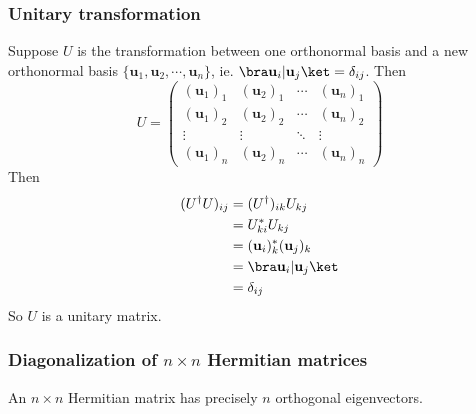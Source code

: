 \documentclass[a4paper]{article}
\begin{document}
\subsubsection{Unitary transformation}
Suppose $U$ is the transformation between one orthonormal basis and a new orthonormal basis $\{\mathbf{u}_1, \mathbf{u}_2, \cdots, \mathbf{u}_n\}$, ie. $\bra \mathbf{u}_i| \mathbf{u}_j\ket = \delta_{ij}$. Then
\[
  U =
  \begin{pmatrix}
    (\mathbf{u}_1)_1 & (\mathbf{u}_2)_1 & \cdots & (\mathbf{u}_n)_1\\
    (\mathbf{u}_1)_2 & (\mathbf{u}_2)_2 & \cdots & (\mathbf{u}_n)_2\\
    \vdots & \vdots & \ddots & \vdots\\
    (\mathbf{u}_1)_n & (\mathbf{u}_2)_n & \cdots & (\mathbf{u}_n)_n
  \end{pmatrix}
\]
Then
\begin{align*}
  (U^\dagger U)_{ij} &= (U^\dagger)_{ik}U_{kj}\\
  &= U_{ki}^* U_{kj}\\
  &= (\mathbf{u}_i)^*_k(\mathbf{u}_j)_k\\
  &= \bra \mathbf{u}_i | \mathbf{u}_j \ket\\
  &= \delta_{ij}
\end{align*}
So $U$ is a unitary matrix.
\subsubsection{Diagonalization of \texorpdfstring{$n\times n$}{n x n} Hermitian matrices}
\begin{thm}
  An $n\times n$ Hermitian matrix has precisely $n$ orthogonal eigenvectors.
\end{thm}
\end{document}
